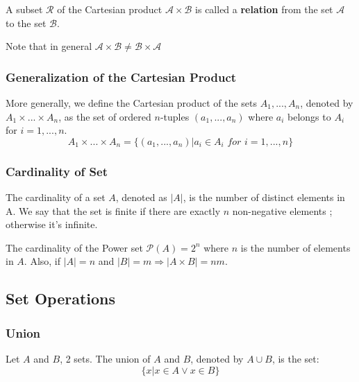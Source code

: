 \documentclass{article}
\begin{document}
\begin{tcolorbox}[width=12.1cm, leftrule=3mm]
A subset $ \mathcal{R} $ of the Cartesian product $ \mathcal{A} \times \mathcal{B} $ is called a \textbf{relation} from the set $ \mathcal{A} $ to the set $ \mathcal{B} $.
\end{tcolorbox}
\begin{tcolorbox}[width=12.1cm, leftrule=3mm]
Note that in general $ \mathcal{A} \times \mathcal{B} \neq \mathcal{B} \times \mathcal{A} $
\end{tcolorbox}

\subsubsection{Generalization of the Cartesian Product} More generally, we define the Cartesian product of the sets $ A_1,...,A_n $, denoted by $ A_1 \times ... \times A_n $, as the set of ordered $ n $-tuples $ (a_1,...,a_n) $ where $ a_i $ belongs to $ A_i $ for $ i=1,...,n $.
\begin{equation}
A_1 \times ... \times A_n =  \{(a_1,...,a_n) | a_i \in A_i \textit{ for } i=1,...,n\}
\end{equation} 

\subsubsection{Cardinality of Set} The cardinality of a set $ A $, denoted as $ |A| $, is the number of distinct elements in A. We say that the set is finite if there are exactly $ n $ non-negative elements ; otherwise it's infinite.

\begin{tcolorbox}[width=12.1cm, leftrule=3mm]
The cardinality of the Power set $ \mathcal{P}(A) = 2^n $ where $ n $ is the number of elements in $ A $. Also, if $ |A| = n $ and $ |B| = m \Rightarrow |A \times B| = nm $. 
\end{tcolorbox}

\subsection{Set Operations}
\subsubsection{Union} Let $ A $ and $ B $, 2 sets. The union of $ A $ and $ B $, denoted by $ A \cup B $, is the set:
\begin{equation}
\{x | x \in A \vee x \in B\}
\end{equation}  
\end{document}
